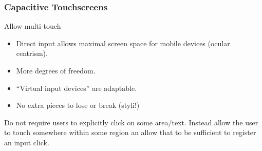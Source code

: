 \subsubsection{Capacitive Touchscreens}
Allow multi-touch

\begin{itemize}
    \item Direct input allows maximal screen space for mobile devices (ocular centrism).
    \item More degrees of freedom.
    \item ``Virtual input devices'' are adaptable.
    \item No extra pieces to lose or break (styli!)
\end{itemize}

Do not require users to explicitly click on some area/text. Instead allow the user to touch somewhere within some region an allow that to be sufficient to register an input click.
